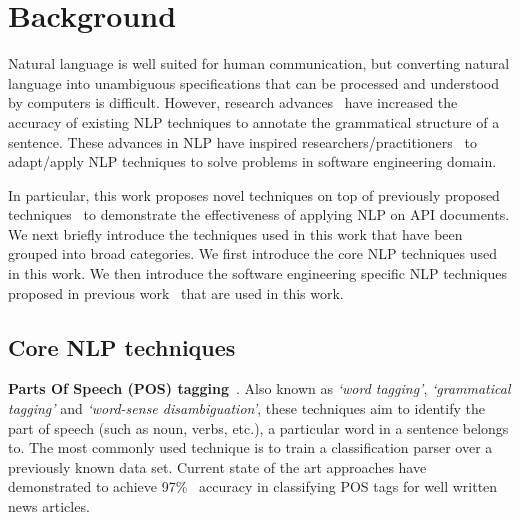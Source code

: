 \section{Background}
\label{sec:background}

Natural language is well suited for human communication, but converting natural language into unambiguous specifications that can be processed and understood by computers is difficult.
However, research advances~\cite{Marneffe06LREC,Marneffe08COLING,Klein03,KleinNIPS03} have increased the accuracy of existing NLP techniques to annotate the grammatical structure of a sentence.
These advances in NLP have inspired researchers/practitioners~\cite{pandita12:inferring, pandita13:WHYPER, johnSlankasPASSAT13, XiaoFSE2012, thummalapentaICSE12} to adapt/apply NLP techniques to solve problems in software engineering domain.

In particular, this work proposes novel techniques on top of previously proposed techniques~\cite{pandita12:inferring, pandita13:WHYPER} to demonstrate the effectiveness of applying NLP on API documents.
We next briefly introduce the techniques used in this work that have been grouped into broad categories.
We first introduce the core NLP techniques used in this work.
We then introduce the software engineering specific NLP techniques proposed in previous work~\cite{pandita12:inferring,pandita13:WHYPER} that are used in this work.

\subsection{Core NLP techniques}
\label{sub:CoreNLPback}



\textbf{Parts Of Speech (POS) tagging}~\cite{Klein03,KleinNIPS03}. Also known as \textit{`word tagging'}, \textit{`grammatical tagging'} and \textit{`word-sense disambiguation'}, these techniques aim to identify the part of speech (such as noun, verbs, etc.), a particular word in a sentence belongs to. The most commonly used technique is to train a classification parser over a previously known data set. Current state of the art approaches have demonstrated to achieve 97\%~\cite{SNLP1} accuracy in classifying POS tags for well written news articles.

